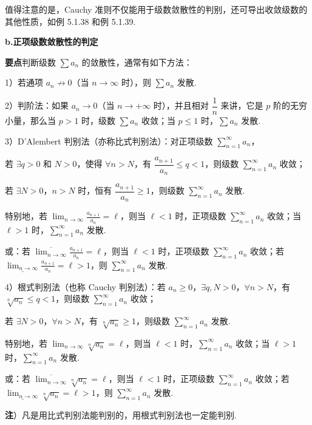 \documentclass[UTF8, 12pt, fontset=fandol, oneside]{ctexart}
\begin{document}
值得注意的是，Cauchy 准则不仅能用于级数敛散性的判别，还可导出收敛级数的其他性质，如例 5.1.38 和例 5.1.39.

\noindent\textbf{b.\quad 正项级数敛散性的判定}

\noindent\textbf{要点}\quad 判断级数 $\sum a_n$ 的敛散性，通常有如下方法：

1）若通项 $a_n\not\to0$（当 $n\to\infty$ 时），则 $\sum a_n$ 发散.

2）判阶法：如果 $a_n\to0$（当 $n\to+\infty$ 时），并且相对 $\dfrac1n$ 来讲，它是 $p$ 阶的无穷小量，那么当 $p>1$ 时，级数 $\sum a_n$ 收敛；当 $p\le1$ 时，$\sum a_n$ 发散.

3）D'Alembert 判别法（亦称比式判别法）：对正项级数 $\displaystyle\sum_{n=1}^\infty a_n$，

若 $\exists q>0$ 和 $N>0$，使得 $\forall n>N$，有 $\dfrac{a_{n+1}}{a_n}\le q<1$，则级数 $\displaystyle\sum_{n=1}^\infty a_n$ 收敛；

若 $\exists N>0$，$n>N$ 时，恒有 $\dfrac{a_{n+1}}{a_n}\ge1$，则级数 $\displaystyle\sum_{n=1}^\infty a_n$ 发散.

特别地，若 $\displaystyle\lim_{n\to\infty}\frac{a_{n+1}}{a_n}=\ell$，则当 $\ell<1$ 时，正项级数 $\displaystyle\sum_{n=1}^\infty a_n$ 收敛；当 $\ell>1$ 时，$\displaystyle\sum_{n=1}^\infty a_n$ 发散.

或：若 $\displaystyle\overline{\lim_{n\to\infty}}\frac{a_{n+1}}{a_n}=\ell$，则当 $\ell<1$ 时，正项级数 $\displaystyle\sum_{n=1}^\infty a_n$ 收敛；若 $\displaystyle\underline{\lim_{n\to\infty}}\frac{a_{n+1}}{a_n}=\ell>1$，则 $\displaystyle\sum_{n=1}^\infty a_n$ 发散.

4）根式判别法（也称 Cauchy 判别法）：若 $a_n\ge0$，$\exists q,N>0$，$\forall n>N$，有 $\sqrt[n]{a_n}\le q<1$，则级数 $\displaystyle\sum_{n=1}^\infty a_n$ 收敛；

若 $\exists N>0$，$\forall n>N$，有 $\sqrt[n]{a_n}\ge1$，则级数 $\displaystyle\sum_{n=1}^\infty a_n$ 发散.

特别地，若 $\displaystyle\lim_{n\to\infty}\sqrt[n]{a_n}=\ell$，则当 $\ell<1$ 时，$\displaystyle\sum_{n=1}^\infty a_n$ 收敛；当 $\ell>1$ 时，$\displaystyle\sum_{n=1}^\infty a_n$ 发散.

或：若 $\displaystyle\overline{\lim_{n\to\infty}}\sqrt[n]{a_n}=\ell$，则当 $\ell<1$ 时，正项级数 $\displaystyle\sum_{n=1}^\infty a_n$ 收敛；若 $\displaystyle\underline{\lim_{n\to\infty}}\sqrt[n]{a_n}=\ell>1$，则 $\displaystyle\sum_{n=1}^\infty a_n$ 发散.

\noindent\textbf{注}）凡是用比式判别法能判别的，用根式判别法也一定能判别.
\end{document}

